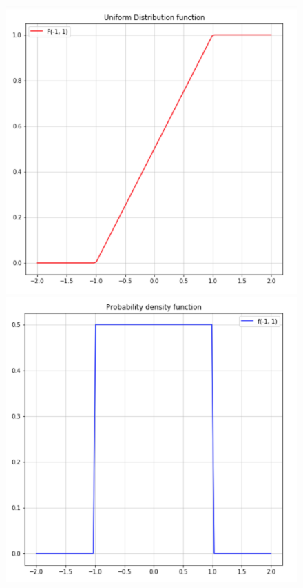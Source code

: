 \documentclass[a4paper,12pt]{article}
\begin{document}
	\begin{figure}[h!]
		\begin{minipage}[b]{0.5\textwidth}
			\includegraphics[width=\textwidth]{examples/F_uniform.png}
		\end{minipage}
		\begin{minipage}[b]{0.5\textwidth}
			\includegraphics[width=\textwidth]{examples/f_uniform2.png}
		\end{minipage}
		\label{ris:examples_1_2}
	\end{figure}
\end{document}
